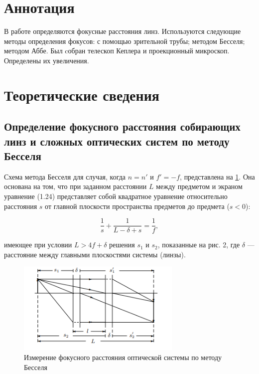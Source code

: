 \section*{Аннотация}
В работе определяются фокусные расстояния линз. Используются следующие методы определения фокусов:
с помощью зрительной трубы; методом Бесселя; методом Аббе. Был cобран телескоп Кеплера и проекционный микроскоп. Определены их увеличения.

\section*{Теоретические сведения}
\subsection*{Определение фокусного расстояния собирающих линз и сложных оптических систем по методу Бесселя}

Схема метода Бесселя для случая, когда $n = n'$ и $f' = -f$, представлена на \ref{fig:bessel}. Она основана на том, что при заданном расстоянии $L$ между предметом и экраном уравнение (1.24) представляет собой квадратное уравнение относительно расстояния $s$ от главной плоскости пространства предметов до предмета ($s < 0$):

\begin{equation}
\frac{1}{s} + \frac{1}{L - \delta + s} = \frac{1}{f},
\label{eq:bessel}
\end{equation}

имеющее при условии $L > 4f + \delta$ решения $s_1$ и $s_2$, показанные на рис. 2, где $\delta$ — расстояние между главными плоскостями системы (линзы).

\begin{figure}[h]
\centering
\includegraphics[width=0.7\textwidth]{images/bessel_method.png}
\caption{Измерение фокусного расстояния оптической системы по методу Бесселя}
\label{fig:bessel}
\end{figure}

